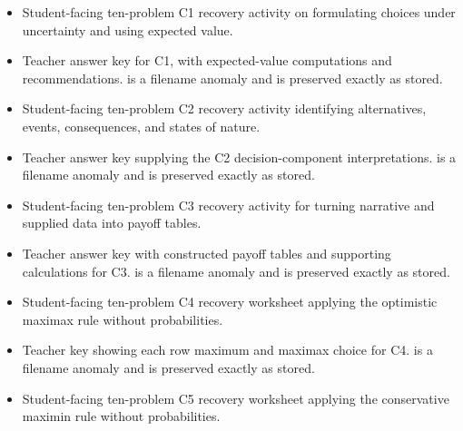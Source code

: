 \begin{itemize}
  \item {}

  Student-facing ten-problem C1 recovery activity on formulating choices under uncertainty and using expected value.

  \item {}

  Teacher answer key for C1, with expected-value computations and recommendations.  is a filename anomaly and is preserved exactly as stored.

  \item {}

  Student-facing ten-problem C2 recovery activity identifying alternatives, events, consequences, and states of nature.

  \item {}

  Teacher answer key supplying the C2 decision-component interpretations.  is a filename anomaly and is preserved exactly as stored.

  \item {}

  Student-facing ten-problem C3 recovery activity for turning narrative and supplied data into payoff tables.

  \item {}

  Teacher answer key with constructed payoff tables and supporting calculations for C3.  is a filename anomaly and is preserved exactly as stored.

  \item {}

  Student-facing ten-problem C4 recovery worksheet applying the optimistic maximax rule without probabilities.

  \item {}

  Teacher key showing each row maximum and maximax choice for C4.  is a filename anomaly and is preserved exactly as stored.

  \item {}

  Student-facing ten-problem C5 recovery worksheet applying the conservative maximin rule without probabilities.


\end{itemize}
